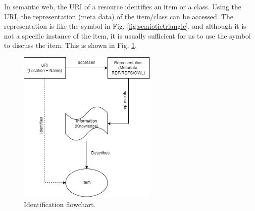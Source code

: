 In semantic web, the URI of a resource identifies an item or a class. Using the URI, the representation (meta data) of the item/class can be accessed. The representation is like the symbol in Fig. \ref{fig:semiotictriangle}, and although it is not a specific instance of the item, it is usually sufficient for us to use the symbol to discuss the item. This is shown in Fig. \ref{fig:identificationflow}.

\begin{figure}[htbp]
	\centering
	\includegraphics[width=0.6\textwidth]{./chapters/ch-semanticwebarchitecture/figures/identificationflow.png}
	\caption{Identification flowchart.}
	\label{fig:identificationflow}
\end{figure} 


